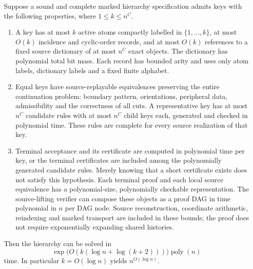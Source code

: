\begin{proposition}
\label{prop:marked-interface-quotient}
Suppose a sound and complete marked hierarchy specification admits
keys with the following properties, where $1\leq k\leq n^C$.
\begin{enumerate}
\item A key has at most $k$ active atoms compactly labelled in
      $\{1,\ldots,k\}$, at most $O(k)$ incidence
      and cyclic-order records, and at most $O(k)$ references to a fixed
      source dictionary of at most $n^C$ exact objects.  The dictionary
      has polynomial total bit mass.  Each record has bounded arity and
      uses only atom labels, dictionary labels and a fixed finite alphabet.
\item Equal keys have source-replayable equivalences preserving the
      entire continuation problem: boundary pattern, orientations,
      peripheral data, admissibility and the correctness of all cuts.
      A representative key has at most $n^C$ candidate rules with at most
      $n^C$ child keys each, generated and checked in polynomial time.
      These rules are complete for every source realization of that key.
\item Terminal acceptance and its certificate are computed in polynomial
      time per key, or the terminal certificates are included among the
      polynomially generated candidate rules.  Merely knowing that a
      short certificate exists does not satisfy this hypothesis.
      Each terminal proof and each local source equivalence has a
      polynomial-size, polynomially checkable representation.  The
      source-lifting verifier can compose these objects as a proof DAG
      in time polynomial in $n$ per DAG node.  Source reconstruction,
      coordinate arithmetic, reindexing and marked transport are included
      in these bounds; the proof does not require exponentially expanding
      shared histories.
\end{enumerate}
Then the hierarchy can be solved in
\[
 \exp\bigl(O(k(\log n+\log(k+2)))\bigr)\operatorname{poly}(n)
\]
time.  In particular $k=O(\log n)$ yields $n^{O(\log n)}$.
\end{proposition}
